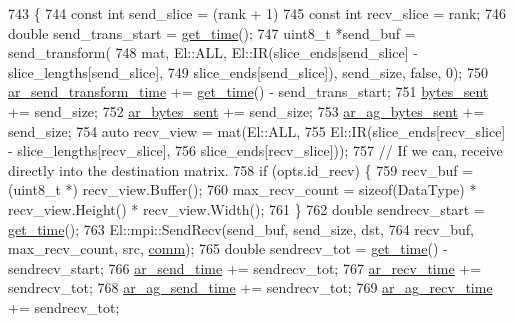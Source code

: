 \begin{DoxyCode}
{743   \{
744     \textcolor{keyword}{const} \textcolor{keywordtype}{int} send\_slice = (rank + 1) %
745     \textcolor{keyword}{const} \textcolor{keywordtype}{int} recv\_slice = rank;
746     \textcolor{keywordtype}{double} send\_trans\_start = \hyperlink{namespacelbann_a478d36031ff0659893c4322cd856157f}{get\_time}();
747     uint8\_t *send\_buf = send\_transform(
748                           mat, El::ALL, El::IR(slice\_ends[send\_slice] - slice\_lengths[send\_slice],
749                                            slice\_ends[send\_slice]), send\_size, \textcolor{keyword}{false}, 0);
750     \hyperlink{classlbann_1_1lbann__comm_a4e3d35520a8f567579f9235e9808ba1c}{ar\_send\_transform\_time} += \hyperlink{namespacelbann_a478d36031ff0659893c4322cd856157f}{get\_time}() - send\_trans\_start;
751     \hyperlink{classlbann_1_1lbann__comm_ad1f146ae7337ece6266fd307944928e0}{bytes\_sent} += send\_size;
752     \hyperlink{classlbann_1_1lbann__comm_aa520c16eafde742b70daf60866afc6a8}{ar\_bytes\_sent} += send\_size;
753     \hyperlink{classlbann_1_1lbann__comm_a2cfe1264a83865360692c48d7869fe67}{ar\_ag\_bytes\_sent} += send\_size;
754     \textcolor{keyword}{auto} recv\_view = mat(El::ALL,
755                          El::IR(slice\_ends[recv\_slice] - slice\_lengths[recv\_slice],
756                                 slice\_ends[recv\_slice]));
757     \textcolor{comment}{// If we can, receive directly into the destination matrix.}
758     \textcolor{keywordflow}{if} (opts.id\_recv) \{
759       recv\_buf = (uint8\_t *) recv\_view.Buffer();
760       max\_recv\_count = \textcolor{keyword}{sizeof}(DataType) * recv\_view.Height() * recv\_view.Width();
761     \}
762     \textcolor{keywordtype}{double} sendrecv\_start = \hyperlink{namespacelbann_a478d36031ff0659893c4322cd856157f}{get\_time}();
763     El::mpi::SendRecv(send\_buf, send\_size, dst,
764                       recv\_buf, max\_recv\_count, src, \hyperlink{file__io_8cpp_ab048c6f9fcbcfaa57ce68b00263dbebe}{comm});
765     \textcolor{keywordtype}{double} sendrecv\_tot = \hyperlink{namespacelbann_a478d36031ff0659893c4322cd856157f}{get\_time}() - sendrecv\_start;
766     \hyperlink{classlbann_1_1lbann__comm_a60a664f47efb52d9936b72d34059d1ef}{ar\_send\_time} += sendrecv\_tot;
767     \hyperlink{classlbann_1_1lbann__comm_a4c9323938961c3524dc67f4b7b47e3ae}{ar\_recv\_time} += sendrecv\_tot;
768     \hyperlink{classlbann_1_1lbann__comm_a64cb0b86e9368c1d83370ba6cb0083ba}{ar\_ag\_send\_time} += sendrecv\_tot;
769     \hyperlink{classlbann_1_1lbann__comm_a1896c3ecd1d5b084497c6ed47c1c9bae}{ar\_ag\_recv\_time} += sendrecv\_tot;
}
\end{DoxyCode}
